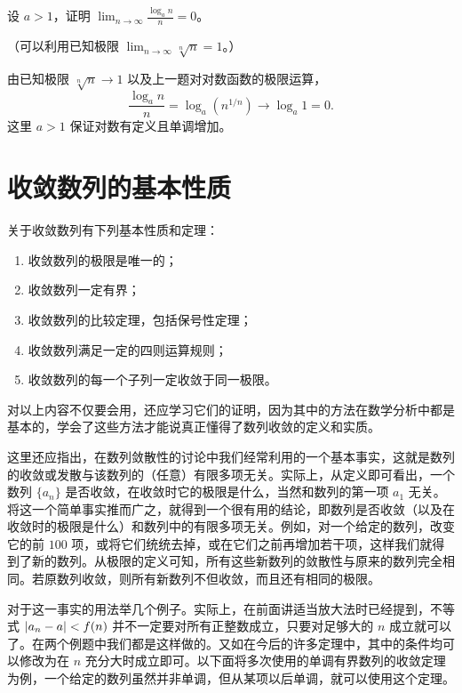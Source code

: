 \begin{xexercise}[5]
设 $a>1$，证明 $\displaystyle\lim_{n\to\infty}\frac{\log_a n}{n}=0$。

  （可以利用已知极限 $\displaystyle\lim_{n\to\infty}\sqrt[n]{n}=1$。）
\end{xexercise}
\begin{xsolution}
由已知极限 $\sqrt[n]n\to1$ 以及上一题对对数函数的极限运算，
\[
  \frac{\log_a n}{n}
  =\log_a\left(n^{1/n}\right)
  \longrightarrow\log_a1=0.
\]
这里 $a>1$ 保证对数有定义且单调增加。
\end{xsolution}


\section{收敛数列的基本性质}

关于收敛数列有下列基本性质和定理：
\begin{enumerate}[label=\arabic*.]
  \item 收敛数列的极限是唯一的；
  \item 收敛数列一定有界；
  \item 收敛数列的比较定理，包括保号性定理；
  \item 收敛数列满足一定的四则运算规则；
  \item 收敛数列的每一个子列一定收敛于同一极限。
\end{enumerate}

对以上内容不仅要会用，还应学习它们的证明，因为其中的方法在数学分析中都是基本的，学会了这些方法才能说真正懂得了数列收敛的定义和实质。

这里还应指出，在数列敛散性的讨论中我们经常利用的一个基本事实，这就是数列的收敛或发散与该数列的（任意）有限多项无关。实际上，从定义即可看出，一个数列 $\{a_n\}$ 是否收敛，在收敛时它的极限是什么，当然和数列的第一项 $a_1$ 无关。将这一个简单事实推而广之，就得到一个很有用的结论，即数列是否收敛（以及在收敛时的极限是什么）和数列中的有限多项无关。例如，对一个给定的数列，改变它的前 $100$ 项，或将它们统统去掉，或在它们之前再增加若干项，这样我们就得到了新的数列。从极限的定义可知，所有这些新数列的敛散性与原来的数列完全相同。若原数列收敛，则所有新数列不但收敛，而且还有相同的极限。

对于这一事实的用法举几个例子。实际上，在前面讲适当放大法时已经提到，不等式 $\lvert a_n-a\rvert<f(n)$ 并不一定要对所有正整数成立，只要对足够大的 $n$ 成立就可以了。在两个例题中我们都是这样做的。又如在今后的许多定理中，其中的条件均可以修改为在 $n$ 充分大时成立即可。以下面将多次使用的单调有界数列的收敛定理为例，一个给定的数列虽然并非单调，但从某项以后单调，就可以使用这个定理。

